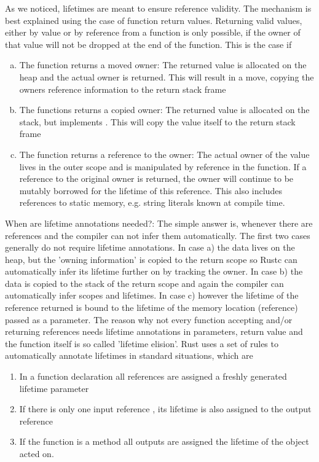 As we noticed, lifetimes are meant to ensure reference validity. The mechanism is best explained using the case of function return values. Returning valid values, either by value or by reference from a function is only possible, if the owner of that value will not be dropped at the end of the function. This is the case if 
\begin{enumerate}[a)]
    \item The function returns a moved owner: The returned value is allocated on the heap and the actual owner is returned. This will result in a move, copying the owners reference information to the return stack frame
    \item The functions returns a copied owner: The returned value is allocated on the stack, but implements . This will copy the value itself to the return stack frame
    \item The function returns a reference to the owner: The actual owner of the value lives in the outer scope and is manipulated by reference in the function. If a reference to the original owner is returned, the owner will continue to be mutably borrowed for the lifetime of this reference. This also includes references to static memory, e.g. string literals known at compile time. 
\end{enumerate}

When are lifetime annotations needed?: The simple answer is, whenever there are references and the compiler can not infer them automatically. The first two cases generally do not require lifetime annotations. In case a) the data lives on the heap, but the 'owning information' is copied to the return scope so Rustc can automatically infer its lifetime further on by tracking the owner. In case b) the data is copied to the stack of the return scope and again the compiler can automatically infer scopes and lifetimes. In case c) however the lifetime of the reference returned is bound to the lifetime of the memory location (reference) passed as a parameter. The reason why not every function accepting and/or returning references needs lifetime annotations in parameters, return value and the function itself is so called 'lifetime elision'. Rust uses a set of rules to automatically annotate lifetimes in standard situations, which are
\begin{enumerate}
    \item In a function declaration  all references are assigned a freshly generated lifetime parameter 
    \item If there is only one input reference , its lifetime is also assigned to the output reference
    \item If the function is a method  all outputs are assigned the lifetime of the object acted on.
\end{enumerate}

